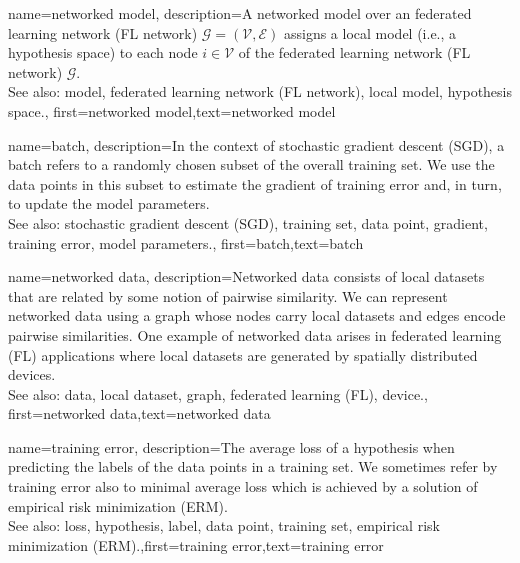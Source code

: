 {name={networked model},
  description={A networked model over an federated learning network (FL network) $\mathcal{G} = \left( \mathcal{V},\mathcal{E} \right)$ assigns 
   a local model (i.e., a hypothesis space) to each node $i \in \mathcal{V}$ of the federated learning network (FL network) $\mathcal{G}$.
   		\\
		See also: model, federated learning network (FL network), local model, hypothesis space.}, 
   first={networked model},text={networked model}  
}

{
	name={batch},
	description={In the context of stochastic gradient descent (SGD), a batch refers to a randomly 
	chosen subset of the overall training set. We use the data points in this subset 
	to estimate the gradient of training error and, in turn, to update the model parameters.
			\\
		See also: stochastic gradient descent (SGD), training set, data point, gradient, training error, model parameters.}, 
	first={batch},text={batch}  
}

{
	name={networked data},
	description={Networked data consists of local datasets 
	that are related by some notion of pairwise similarity. We can represent networked 
	data using a graph whose nodes carry local datasets and edges encode 
	pairwise similarities. One example of networked data arises in federated learning (FL) applications 
	where local datasets are generated by spatially distributed devices.
			\\
		See also: data, local dataset, graph, federated learning (FL), device.}, 
	first={networked data},text={networked data}  
}

{
	name={training error},
	description={The average loss of a hypothesis when 
		predicting the labels of the data points in a training set. 
		We sometimes refer by training error also to minimal average loss 
		which is achieved by a solution of empirical risk minimization (ERM).
				\\
		See also: loss, hypothesis, label, data point, training set, empirical risk minimization (ERM).},first={training error},text={training error}  
}

